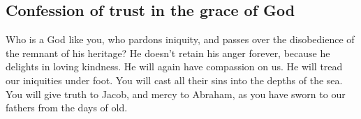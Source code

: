 \hypertarget{confession-of-trust-in-the-grace-of-god}{%
\subsection{Confession of trust in the grace of
God}\label{confession-of-trust-in-the-grace-of-god}}

 Who is a God like you, who pardons iniquity, and passes
over the disobedience of the remnant of his heritage? He doesn't retain
his anger forever, because he delights in loving kindness.
 He will again have compassion on us. He will tread our
iniquities under foot. You will cast all their sins into the depths of
the sea.  You will give truth to Jacob, and mercy to
Abraham, as you have sworn to our fathers from the days of old.
